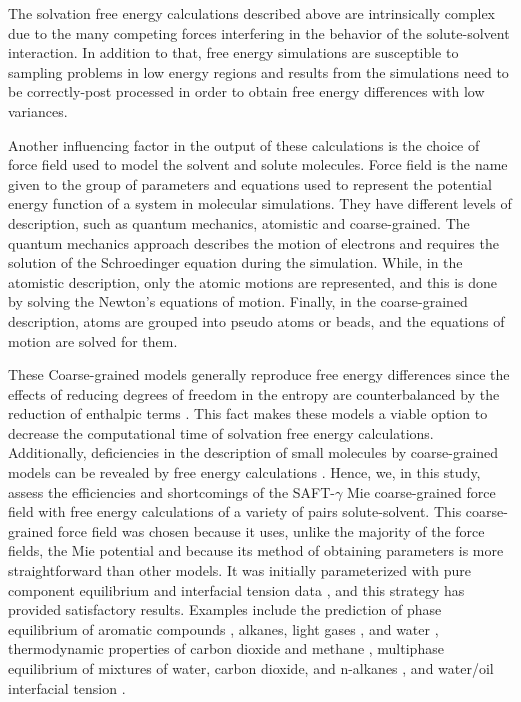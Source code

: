 The solvation free energy calculations described above are intrinsically complex due to the many competing forces interfering in the behavior of the solute-solvent interaction. In addition to that, free energy simulations are susceptible to sampling problems in low energy regions and results from the simulations need to be correctly-post processed in order to obtain free energy differences with low variances. {Another influencing factor in the output of these calculations is the choice of force field used to model the solvent and solute molecules. Force field is the name given to the group of parameters and equations used to represent the potential energy function of a system in molecular simulations. They have different levels of description, such as quantum mechanics, atomistic and coarse-grained. The quantum mechanics approach describes the motion of electrons and requires the solution of the Schroedinger equation during the simulation. While, in the atomistic description, only the atomic motions are represented,  and this is done by solving the Newton's equations of motion. Finally, in the coarse-grained description, atoms are grouped into pseudo atoms or beads, and the equations of motion are solved for them. 
	
These Coarse-grained models generally reproduce free energy differences since the effects of reducing degrees of freedom in the entropy are counterbalanced by the reduction of enthalpic terms \cite{kmiecik2016}. This fact makes these models a viable option to  decrease the computational time of solvation free energy calculations. Additionally, deficiencies in the description of small molecules by coarse-grained models can be revealed by free energy calculations \cite{mobley2007,shirts2013}. Hence, we, in this study, assess the efficiencies and shortcomings of the SAFT-$\gamma$ Mie coarse-grained force field  \cite{avendano2011} with free energy calculations of a variety of pairs solute-solvent. This coarse-grained force field was chosen because it uses, unlike the majority of the force fields, the Mie potential \cite{MIE} and because its method of obtaining parameters is more straightforward than other models. It was initially parameterized with pure component equilibrium and interfacial tension data \cite{avendano2011}, and this strategy has provided satisfactory results. Examples include the prediction of phase equilibrium of aromatic compounds \cite{muller2017}, alkanes, light gases \cite{herdes2015}, and water \cite{lobanova2015}, thermodynamic properties of carbon dioxide and methane \cite{cassiano1}, multiphase equilibrium of mixtures of water, carbon dioxide, and n-alkanes \cite{lobanova2016}, and water/oil interfacial tension \cite{herdes2017}.} 


